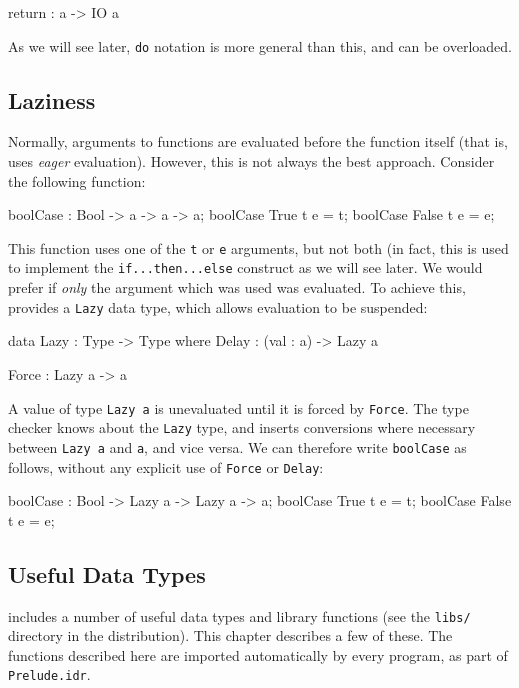 \begin{code}
return : a -> IO a
\end{code}

\noindent
As we will see later, \texttt{do} notation is more general than this, and can be overloaded.

\subsection{Laziness}

\label{sect:lazy}
Normally, arguments to functions are evaluated before the function itself
(that is, \Idris{} uses \emph{eager} evaluation). However, this is not always
the best approach. Consider the following function:

\begin{code}
boolCase : Bool -> a -> a -> a; 
boolCase True  t e = t;
boolCase False t e = e;
\end{code}

\noindent
This function uses one of the \texttt{t} or \texttt{e} arguments, but not both (in fact, this is used to implement the \texttt{if...then...else} construct as we will see later. 
We would prefer if \emph{only} the argument which was used was evaluated.
To achieve this, \Idris{} provides a \texttt{Lazy} data type, which allows evaluation to be suspended:

\begin{code}
data Lazy : Type -> Type where
     Delay : (val : a) -> Lazy a

Force : Lazy a -> a
\end{code}

\noindent
A value of type \texttt{Lazy a} is unevaluated until it is forced by \texttt{Force}. 
The \Idris{} type checker knows about the \texttt{Lazy} type, and inserts conversions where necessary between \texttt{Lazy a} and \texttt{a}, and vice versa.
We can therefore write \texttt{boolCase} as follows, without any explicit
use of \texttt{Force} or \texttt{Delay}:

\begin{code}
boolCase : Bool -> Lazy a -> Lazy a -> a; 
boolCase True  t e = t;
boolCase False t e = e;
\end{code}


\subsection{Useful Data Types}

\Idris{} includes a number of useful data types and library functions (see the \texttt{libs/} directory in the distribution).
This chapter describes a few of these.
The functions described here are imported automatically by every \Idris{} program, as part of \texttt{Prelude.idr}.

